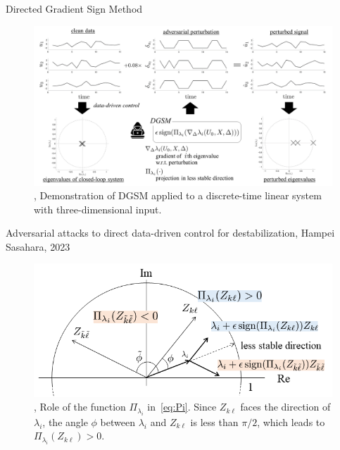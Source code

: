 \documentclass[aspectratio=169, handout, 10pt, hyperref=colorlinks]{beamer}
\begin{document}
\begin{frame}[allowframebreaks]{Directed Gradient Sign Method}
\begin{figure}[H]
  \centering
  \includegraphics[width=0.7\linewidth]{Images/vulnerable_instance.png}
  \caption{\cite{10383531},
  Demonstration of DGSM applied to a discrete-time linear system with three-dimensional input.
  }
  \label{fig:vuln_ins}
\end{figure}
\begin{center}
\tiny{Adversarial attacks to direct data-driven control for destabilization, Hampei Sasahara, 2023}
\end{center}
\begin{figure}[H]
\includegraphics[width=0.6\linewidth]{Pi.png}
\caption{\cite{10383531}, Role of the function $\Pi_{\lambda_i}$ in~\eqref{eq:Pi}.
  Since $Z_{k\ell}$ faces the direction of $\lambda_i$, the angle $\phi$ between $\lambda_i$ and $Z_{k\ell}$ is less than $\pi/2$, which leads to $\Pi_{\lambda_i}(Z_{k\ell})>0$.
}
\end{figure}
\end{frame}
\end{document}
